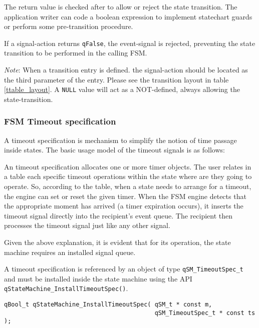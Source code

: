 The return value is checked after to allow or reject the state transition. The application writer can code a boolean expression to implement statechart guards or perform some pre-transition procedure.

\begin{tcolorbox}
\HandRight If a signal-action returns \lstinline{qFalse}, the event-signal is rejected, preventing the state transition to be performed in the calling FSM.
\end{tcolorbox}

\begin{tcolorbox}
\ArrowBoldDownRight \textit{Note}: When a transition entry is defined. the signal-action should be located as the third parameter of the entry. Please see the transition layout in table \ref{ttable_layout}.
A \lstinline{NULL} value will act as a NOT-defined, always allowing the state-transition. 
\end{tcolorbox}


\subsubsection{FSM Timeout specification}
A timeout specification is mechanism to simplify the notion of time passage inside states. The basic usage model of the timeout signals is as follows:

An timeout specification allocates one or more timer objects. The user relates in a table each specific timeout operations within the state where are they going to operate. So, according to the table, when a state needs to arrange for a timeout, the engine can set or reset the given timer.  When the FSM engine detects that the appropriate moment has arrived (a timer expiration occurs), it inserts the timeout signal directly into the recipient's event queue. The recipient then processes the timeout signal just like any other signal.

Given the above explanation, it is evident that for its operation, the state machine requires an installed signal queue.

A timeout specification is referenced by an object of type \lstinline{qSM_TimeoutSpec_t} and must be installed inside the state machine using the API \lstinline{qStateMachine_InstallTimeoutSpec()}.
\medskip

\begin{lstlisting}[style=CStyle]
qBool_t qStateMachine_InstallTimeoutSpec( qSM_t * const m,  
                                          qSM_TimeoutSpec_t * const ts );
\end{lstlisting} 

